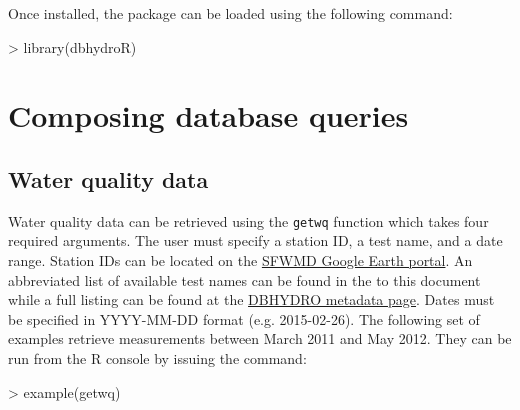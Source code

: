 \documentclass[12pt,notitlepage]{article}
\begin{document}
\vspace{8pt}

\noindent Once installed, the package can be loaded using the following command:


\begin{Schunk}
\begin{Sinput}
> library(dbhydroR)
\end{Sinput}
\end{Schunk}


\section{Composing database queries}
\subsection{Water quality data}

Water quality data can be retrieved using the \texttt{getwq} function which takes four required arguments. The user must specify a station ID, a test name, and a date range. Station IDs can be located on the \href{http://my.sfwmd.gov/KMLEXT/CUSTOMKMLS/DBHydro/DBHydroKML/DBHYDRO_KML.kmz}{SFWMD Google Earth portal}. An abbreviated list of available test names can be found in the  to this document while a full listing can be found at the \href{http://my.sfwmd.gov/dbhydroplsql/show_dbkey_info.show_data_type_info}{DBHYDRO metadata page}. Dates must be specified in YYYY-MM-DD format (e.g. 2015-02-26).   The following set of examples retrieve measurements between March 2011 and May 2012. They can be run from the R console by issuing the command:

\begin{Schunk}
\begin{Sinput}
> example(getwq)
\end{Sinput}
\end{Schunk}
\end{document}
